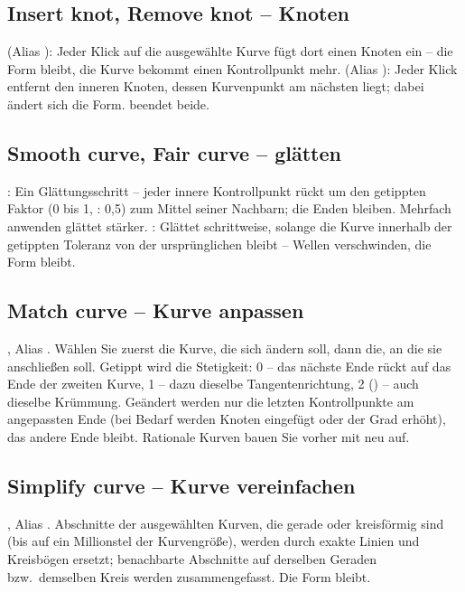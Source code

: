 \subsection{Insert knot, Remove knot -- Knoten}\label{sec:cmd-knots}
 (Alias ): Jeder Klick auf die ausgewählte Kurve fügt dort
einen Knoten ein -- die Form bleibt, die Kurve bekommt einen Kontrollpunkt mehr.
 (Alias ): Jeder Klick entfernt den inneren Knoten, dessen
Kurvenpunkt am nächsten liegt; dabei ändert sich die Form.  beendet beide.

\subsection{Smooth curve, Fair curve -- glätten}\label{sec:cmd-smooth}
: Ein Glättungsschritt -- jeder innere Kontrollpunkt rückt um den getippten Faktor
(0 bis 1, : 0,5) zum Mittel seiner Nachbarn; die Enden bleiben. Mehrfach anwenden
glättet stärker. : Glättet schrittweise, solange die Kurve innerhalb der getippten
Toleranz von der ursprünglichen bleibt -- Wellen verschwinden, die Form bleibt.

\subsection{Match curve -- Kurve anpassen}\label{sec:cmd-match}
, Alias . Wählen Sie zuerst die Kurve, die sich ändern soll, dann die,
an die sie anschließen soll. Getippt wird die Stetigkeit: 0 -- das nächste Ende rückt auf das
Ende der zweiten Kurve, 1 -- dazu dieselbe Tangentenrichtung, 2 () -- auch dieselbe
Krümmung. Geändert werden nur die letzten Kontrollpunkte am angepassten Ende (bei Bedarf werden
Knoten eingefügt oder der Grad erhöht), das andere Ende bleibt. Rationale Kurven bauen Sie vorher
mit  neu auf.

\subsection{Simplify curve -- Kurve vereinfachen}\label{sec:cmd-simplify}
, Alias . Abschnitte der ausgewählten Kurven, die gerade oder
kreisförmig sind (bis auf ein Millionstel der Kurvengröße), werden durch exakte Linien und
Kreisbögen ersetzt; benachbarte Abschnitte auf derselben Geraden bzw.\ demselben Kreis werden
zusammengefasst. Die Form bleibt.

